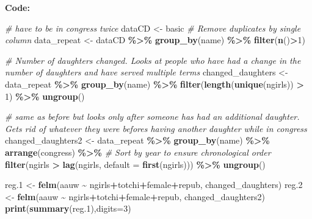 \documentclass[
]{article}
\newenvironment{Shaded}{\begin{snugshade}}{\end{snugshade}}
\newcommand{\AttributeTok}[1]{\textcolor[rgb]{0.13,0.29,0.53}{#1}}
\newcommand{\CommentTok}[1]{\textcolor[rgb]{0.56,0.35,0.01}{\textit{#1}}}
\newcommand{\DecValTok}[1]{\textcolor[rgb]{0.00,0.00,0.81}{#1}}
\newcommand{\FloatTok}[1]{\textcolor[rgb]{0.00,0.00,0.81}{#1}}
\newcommand{\FunctionTok}[1]{\textcolor[rgb]{0.13,0.29,0.53}{\textbf{#1}}}
\newcommand{\NormalTok}[1]{#1}
\newcommand{\OtherTok}[1]{\textcolor[rgb]{0.56,0.35,0.01}{#1}}
\newcommand{\SpecialCharTok}[1]{\textcolor[rgb]{0.81,0.36,0.00}{\textbf{#1}}}
\begin{document}
\textbf{Code:}

\begin{Shaded}
\begin{Highlighting}[]
\CommentTok{\# have to be in congress twice }
\NormalTok{dataCD }\OtherTok{\textless{}{-}}\NormalTok{ basic}
\CommentTok{\# Remove duplicates by single column}
\NormalTok{data\_repeat }\OtherTok{\textless{}{-}}\NormalTok{ dataCD }\SpecialCharTok{\%\textgreater{}\%}
  \FunctionTok{group\_by}\NormalTok{(name) }\SpecialCharTok{\%\textgreater{}\%}
  \FunctionTok{filter}\NormalTok{(}\FunctionTok{n}\NormalTok{()}\SpecialCharTok{\textgreater{}}\DecValTok{1}\NormalTok{) }


\CommentTok{\# Number of daughters changed. Looks at people who have had a change in the number of daughters and have served multiple terms }
\NormalTok{changed\_daughters }\OtherTok{\textless{}{-}}\NormalTok{ data\_repeat }\SpecialCharTok{\%\textgreater{}\%}
  \FunctionTok{group\_by}\NormalTok{(name) }\SpecialCharTok{\%\textgreater{}\%}
  \FunctionTok{filter}\NormalTok{(}\FunctionTok{length}\NormalTok{(}\FunctionTok{unique}\NormalTok{(ngirls)) }\SpecialCharTok{\textgreater{}} \DecValTok{1}\NormalTok{) }\SpecialCharTok{\%\textgreater{}\%}
  \FunctionTok{ungroup}\NormalTok{()}

\CommentTok{\# same as before but looks only after someone has had an additional daughter. Gets rid of whatever they were befores having another daughter while in congress}
\NormalTok{changed\_daughters2 }\OtherTok{\textless{}{-}}\NormalTok{ data\_repeat }\SpecialCharTok{\%\textgreater{}\%}
  \FunctionTok{group\_by}\NormalTok{(name) }\SpecialCharTok{\%\textgreater{}\%}
  \FunctionTok{arrange}\NormalTok{(congress) }\SpecialCharTok{\%\textgreater{}\%}  \CommentTok{\# Sort by year to ensure chronological order}
  \FunctionTok{filter}\NormalTok{(ngirls }\SpecialCharTok{\textgreater{}} \FunctionTok{lag}\NormalTok{(ngirls, }\AttributeTok{default =} \FunctionTok{first}\NormalTok{(ngirls))) }\SpecialCharTok{\%\textgreater{}\%}
  \FunctionTok{ungroup}\NormalTok{()}


\NormalTok{reg}\FloatTok{.1} \OtherTok{\textless{}{-}} \FunctionTok{felm}\NormalTok{(aauw }\SpecialCharTok{\textasciitilde{}}\NormalTok{ ngirls}\SpecialCharTok{+}\NormalTok{totchi}\SpecialCharTok{+}\NormalTok{female}\SpecialCharTok{+}\NormalTok{repub, changed\_daughters)}
\NormalTok{reg}\FloatTok{.2} \OtherTok{\textless{}{-}} \FunctionTok{felm}\NormalTok{(aauw }\SpecialCharTok{\textasciitilde{}}\NormalTok{ ngirls}\SpecialCharTok{+}\NormalTok{totchi}\SpecialCharTok{+}\NormalTok{female}\SpecialCharTok{+}\NormalTok{repub, changed\_daughters2)}
\FunctionTok{print}\NormalTok{(}\FunctionTok{summary}\NormalTok{(reg}\FloatTok{.1}\NormalTok{),}\AttributeTok{digits=}\DecValTok{3}\NormalTok{)}
\end{Highlighting}
\end{Shaded}
\end{document}
